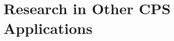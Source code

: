 \documentclass[10pt]{article}
\begin{document}




\section{Research in Other CPS Applications}
\end{document}
